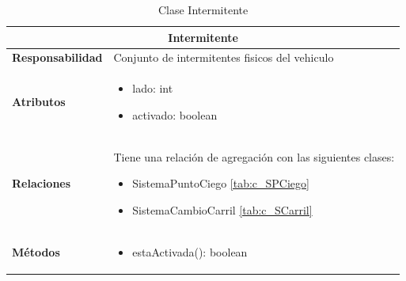 \begin{table}[H]
\begin{center}
\begin{tabular}{p{} p{11cm}}
\multicolumn{2}{c}{\textbf{Intermitente} } \\ \hline \hline
\textbf{Responsabilidad} &  Conjunto de intermitentes fisicos del vehiculo\\ \hline
\textbf{Atributos} &  \begin{itemize} \item lado: int \item activado: boolean \end{itemize}\\ \hline
\textbf{Relaciones} & \par Tiene una relación de agregación con las siguientes clases:
                      \begin{itemize}
                        \item SistemaPuntoCiego \ref{tab:c_SPCiego}
                        \item SistemaCambioCarril \ref{tab:c_SCarril}
                      \end{itemize}
                      \\ \hline

\textbf{Métodos} &  \begin{itemize}
                      \item estaActivada(): boolean
                    \end{itemize}\\ \hline
\end{tabular}
\caption{Clase Intermitente}
\label{tab:c_Intermitente}
\end{center}
\end{table}








